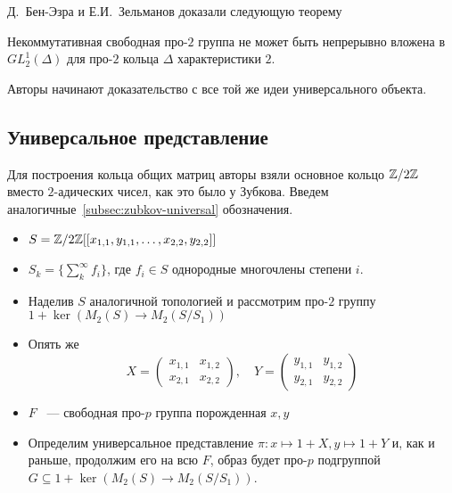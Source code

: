 Д.\ Бен-Эзра и Е.И.\ Зельманов доказали следующую теорему
\begin{theorem}[А.Н.\ Зубков, 1989]
    \label{thm:ben-ezra-zelmanov-main}
    Некоммутативная свободная про-$2$ группа не может быть непрерывно вложена в $GL^1_2(\Delta)$ для про-$2$ кольца $\Delta$ характеристики $2$.
\end{theorem}
Авторы начинают доказательство с все той же идеи универсального объекта.

\subsection{Универсальное представление}\label{subsec:ben-ezra-zelmanov-universal}
Для построения кольца общих матриц авторы взяли основное кольцо $\mathbb{Z}/2\mathbb{Z}$ вместо $2$-адических чисел, как это было у Зубкова.
Введем аналогичные~\ref{subsec:zubkov-universal} обозначения.

\begin{itemize}
    \item $S = \mathbb{Z}/2\mathbb{Z} [[ x_{1,1}, y_{1,1}, \ldots, x_{2,2}, y_{2,2} ]]$
    \item $S_k = \{\sum\limits_k^{\infty} f_i \}$, где $f_i\in S$ однородные многочлены степени $i$.
    \item Наделив $S$ аналогичной топологией и рассмотрим про-$2$ группу $1 + \ker{(M_2(S) \to M_2(S / S_1))}$
    \item Опять же
    \[
        X=
        \begin{pmatrix}
            x_{1,1} & x_{1,2} \\
            x_{2,1} & x_{2,2}
        \end{pmatrix},
        \quad
        Y=
        \begin{pmatrix}
            y_{1,1} & y_{1,2} \\
            y_{2,1} & y_{2,2}
        \end{pmatrix}
    \]
    \item $F$ ~--- свободная про-$p$ группа порожденная $x,y$
    \item Определим универсальное представление $\pi: x \mapsto 1 + X, y \mapsto 1 + Y$ и, как и раньше, продолжим его на всю $F$, образ будет про-$p$ подгруппой $G\subseteq 1 + \ker{(M_2(S) \to M_2(S / S_1))}$.
\end{itemize}


